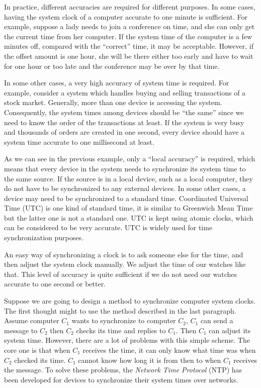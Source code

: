 In practice, different accuracies are required for different purposes. 
In some cases, having the system clock of a computer accurate to one
minute is sufficient. For example, suppose a lady needs to join a conference on
time, and she can only get the current time from her computer. If the system
time of the computer is a few minutes off, compared with the ``correct'' time,
it may be acceptable. However, if the offset amount is one hour, she will be
there either too early and have to wait for one hour or too late and the
conference may be over by that time.

In some other cases, a very high accuracy of system time is required. For
example, consider a system which handles buying and selling transactions of a
stock market.  Generally, more than one device is accessing the system.
Consequently, the system times among devices should be ``the same'' since we
need to know the order of the transactions at least. If the system is very busy
and thousands of orders are created in one second, every device should have a
system time accurate to one millisecond at least.

As we can see in the previous example, only a ``local accuracy'' is required,
which means that every device in the system needs to synchronize its system
time to the same source. If the source is in a local device, such as a local
computer, they do not
have to be synchronized to any external devices. In some other cases, a device
may need to be synchronized to a standard time. 
Coordinated Universal Time (UTC) is one kind of standard time, it is similar 
to Greenwich Mean Time but the latter one is not a standard one. UTC is kept
using atomic clocks, which can be considered to be very accurate. UTC is widely
used for time synchronization purposes.

An easy way of synchronizing a clock is to ask someone else for the time, and
then adjust the system clock manually. We adjust the time of our
watches like that. This level of accuracy is quite sufficient if we do not need
our watches accurate to one second or better. 

Suppose we are going to design a method to synchronize computer system clocks.
The first thought might to use the method described in the last paragraph.
Assume computer $C_1$ wants to synchronize to computer $C_2$, $C_1$ can
send a message to $C_2$ then $C_2$ checks its time and replies to $C_1$. Then
$C_1$ can adjust its system time.  However, there are a lot of problems with
this simple scheme. The core one is that when $C_1$ receives the time, it can
only know what time was when $C_2$ checked its time. $C_1$ cannot know how long
it is from then to when $C_1$ receives the message. To solve these problems,
the \emph{Network Time Protocol} (NTP) has been developed for devices to
synchronize their system times over networks. 

